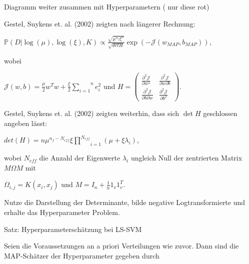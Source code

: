 \documentclass{beamer}
\begin{document}
{\begin{frame}

Diagramm weiter zusammen mit Hyperparametern ( nur diese rot)

\end{frame}


\begin{frame}
Gestel, Suykens et. al. (2002) zeigten nach längerer Rechnung:

\begin{center}
$\mathbb{P}(D\vert \log(\mu),\log(\xi),K) \propto \frac{\sqrt{\mu^{n_f} \xi^n}}{\sqrt{det H}} \exp(- \mathcal{J}(w_{MAP},b_{MAP}))$,
\end{center}

wobei 
\begin{center}
	$\mathcal{J}(w,b) = \frac{\mu}{2}w^T w + \frac{\xi}{2}\overset{n}{\underset{i=1}			{\sum}} e_i ^2 \text{ und } H = \begin{pmatrix}
	\frac{\partial^2 \mathcal{J}}{\partial w^2 } & \frac{\partial^2 \mathcal{J}}				{\partial w \partial b } \\
	\frac{\partial^2 \mathcal{J}}{\partial b \partial w } & \frac{\partial^2 					\mathcal{J}}{\partial b^2 }
	\end{pmatrix}.$
\end{center}
\end{frame}


\begin{frame}

Gestel, Suykens et. al. (2002) zeigten weiterhin, dass sich $\det H $ geschlossen angeben lässt:

\begin{center}
$det(H) = n \mu^{n_f - N_{eff}} \xi \underset{i=1}{\overset{N_{eff}}{\prod}}(\mu + \xi \lambda_i)$,
\end{center}

wobei $N_{eff}$ die Anzahl der Eigenwerte $\lambda_i$ ungleich Null der zentrierten Matrix $M \Omega M$ mit
\begin{center}
$\Omega_{i,j} = K(x_i, x_j)$ und $M = I_n + \frac{1}{n} 1_v 1_v^T$.
\end{center}
Nutze die Darstellung der Determinante, bilde negative Logtransformierte und erhalte das Hyperparameter Problem.
\end{frame}


\begin{frame}
\begin{block}{Satz: Hyperparameterschätzung bei LS-SVM}

Seien die Voraussetzungen an a priori Verteilungen wie zuvor. Dann sind die MAP-Schätzer der Hyperparameter gegeben durch


\end{block}
\end{frame}}
\end{document}
